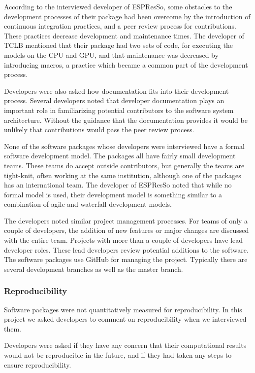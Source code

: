 \documentclass[12pt, notitlepage]{article}
\begin{document}
According to the interviewed developer of ESPResSo, some obstacles to the development processes of their package had been overcome by the introduction of continuous integration practices, and a peer review process for contributions. These practices decrease development and maintenance times. The developer of TCLB mentioned that their package had two sets of code, for executing the models on the CPU and GPU, and that maintenance was decreased by introducing macros, a practice which became a common part of the development process. 

Developers were also asked how documentation fits into their development process. Several developers noted that developer documentation plays an important role in familiarizing potential contributors to the software system architecture. Without the guidance that the documentation provides it would be unlikely that contributions would pass the peer review process. 

None of the software packages whose developers were interviewed have a formal software development model. The packages all have fairly small development teams. These teams do accept outside contributors, but generally the teams are tight-knit, often working at the same institution, although one of the packages has an international team. The developer of ESPResSo noted that while no formal model is used, their development model is something similar to a combination of agile and waterfall development models. 

The developers noted similar project management processes. For teams of only a couple of developers, the addition of new features or major changes are discussed with the entire team. Projects with more than a couple of developers have lead developer roles. These lead developers review potential additions to the software. The software packages use GitHub for managing the project. Typically there are several development branches as well as the master branch.

\subsubsection{Reproducibility}

Software packages were not quantitatively measured for reproducibility.
In this project we asked developers to comment on reproducibility when we interviewed them.

Developers were asked if they have any concern that their computational results would not be reproducible in the future, and if they had taken any steps to ensure reproducibility.
\end{document}
